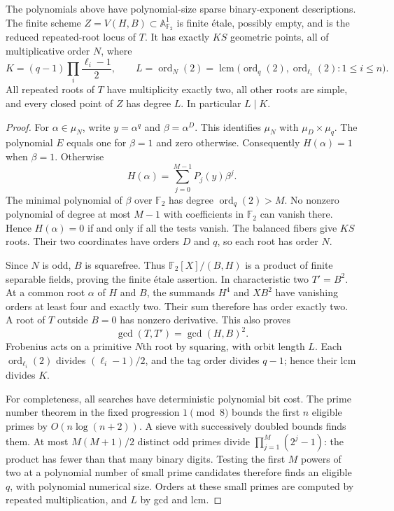 \begin{theorem}\label{thm:ff-binary}
The polynomials above have polynomial-size sparse binary-exponent descriptions. The finite scheme
$Z=V(H,B)\subset\mathbb A^1_{\mathbb F_2}$ is finite \'etale, possibly empty, and is the reduced repeated-root locus of $T$. It has exactly $KS$ geometric points, all of multiplicative order $N$, where
\[
 K=(q-1)\prod_i\frac{\ell_i-1}{2},
 \qquad
 L=\operatorname{ord}_N(2)
   =\operatorname{lcm}\bigl(\operatorname{ord}_q(2),
                            \operatorname{ord}_{\ell_i}(2):1\leq i\leq n\bigr).
\]
All repeated roots of $T$ have multiplicity exactly two, all other roots are simple, and every closed point of $Z$ has degree $L$. In particular $L\mid K$.
\end{theorem}
\begin{proof}
For $\alpha\in\mu_N$, write $y=\alpha^q$ and $\beta=\alpha^D$. This identifies $\mu_N$ with $\mu_D\times\mu_q$. The polynomial $E$ equals one for $\beta=1$ and zero otherwise. Consequently $H(\alpha)=1$ when $\beta=1$. Otherwise
\[
 H(\alpha)=\sum_{j=0}^{M-1}P_j(y)\beta^j.
\]
The minimal polynomial of $\beta$ over $\mathbb F_2$ has degree $\operatorname{ord}_q(2)>M$. No nonzero polynomial of degree at most $M-1$ with coefficients in $\mathbb F_2$ can vanish there. Hence $H(\alpha)=0$ if and only if all the tests vanish. The balanced fibers give $KS$ roots. Their two coordinates have orders $D$ and $q$, so each root has order $N$.

Since $N$ is odd, $B$ is squarefree. Thus $\mathbb F_2[X]/(B,H)$ is a product of finite separable fields, proving the finite \'etale assertion. In characteristic two $T'=B^2$. At a common root $\alpha$ of $H$ and $B$, the summands $H^4$ and $XB^2$ have vanishing orders at least four and exactly two. Their sum therefore has order exactly two. A root of $T$ outside $B=0$ has nonzero derivative. This also proves
\[
 \gcd(T,T')=\gcd(H,B)^2.
\]
Frobenius acts on a primitive $N$th root by squaring, with orbit length $L$. Each $\operatorname{ord}_{\ell_i}(2)$ divides $(\ell_i-1)/2$, and the tag order divides $q-1$; hence their lcm divides $K$.

For completeness, all searches have deterministic polynomial bit cost. The prime number theorem in the fixed progression $1\pmod8$ bounds the first $n$ eligible primes by $O(n\log(n+2))$. A sieve with successively doubled bounds finds them. At most $M(M+1)/2$ distinct odd primes divide $\prod_{j=1}^M(2^j-1)$: the product has fewer than that many binary digits. Testing the first $M$ powers of two at a polynomial number of small prime candidates therefore finds an eligible $q$, with polynomial numerical size. Orders at these small primes are computed by repeated multiplication, and $L$ by gcd and lcm.


\end{proof}
